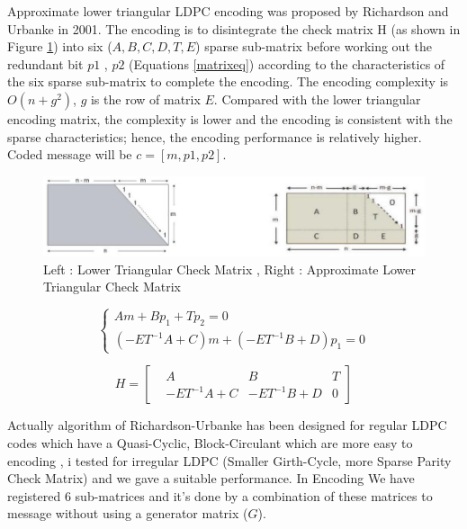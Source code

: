 Approximate lower triangular LDPC encoding was proposed by Richardson and Urbanke in 2001. The encoding is to disintegrate the check matrix H (as shown in Figure \ref{matrix}) into six ($A, B, C, D, T , E$) sparse sub-matrix before working out the redundant bit $p1$ , $p2$ (Equations \ref{matrixeq}) according to the characteristics of the six sparse sub-matrix to complete the encoding. The encoding complexity is $O(n + g^{2})$, $g$ is the row of matrix $E$. Compared with the lower triangular encoding matrix, the complexity is lower and the encoding is consistent with the sparse characteristics; hence, the encoding performance is relatively higher. Coded message will be $c = [m, p1 ,p2]$.
\begin{figure}[h]
\centering
\includegraphics[scale=0.6]{Figures/matrix.jpg}
\caption{Left : Lower Triangular Check Matrix , Right : Approximate Lower Triangular Check Matrix }
\label{matrix}
\end{figure}


 
\begin{equation} \label{matrixeq}
\left\{\begin{matrix}
Am + Bp_{1} + Tp_{2} = 0 \\
(-ET^{-1}A + C)m + (-ET^{-1}B + D)p_{1} = 0
\end{matrix}\right.
\end{equation}

\begin{equation}
H = 
\begin{bmatrix}
 & A & B & T\\ 
 & -ET^{-1}A + C & -ET^{-1}B + D & 0
\end{bmatrix}
\end{equation}

Actually algorithm of Richardson-Urbanke has been designed for regular LDPC codes which have a Quasi-Cyclic, Block-Circulant which are more easy to encoding , i tested for irregular LDPC (Smaller Girth-Cycle, more Sparse Parity Check Matrix) and we gave a suitable performance. In Encoding We have registered 6 sub-matrices and it's done by a combination of these matrices to message without using a generator matrix ($G$)\citep{richardson}.  


